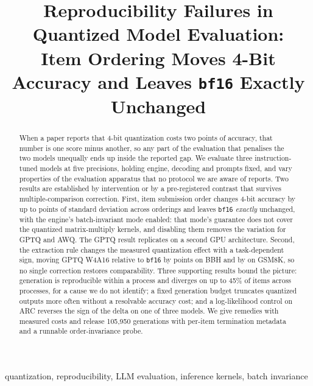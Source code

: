 \documentclass[conference]{IEEEtran}
\title{Reproducibility Failures in Quantized Model Evaluation:\\
Item Ordering Moves 4-Bit Accuracy and Leaves \texttt{bf16} Exactly Unchanged}
\author{%
\IEEEauthorblockN{Joseph Sankoorikal Johny}
\IEEEauthorblockA{Independent Researcher\\Seattle, USA\\\texttt{joseph.sankoorikal@gmail.com}}
\and
\IEEEauthorblockN{Syed Ahmed Danish}
\IEEEauthorblockA{Independent Researcher\\Hartford, USA\\\texttt{syed.danish47@gmail.com}}
\and
\IEEEauthorblockN{Aniruddha Sharma}
\IEEEauthorblockA{Independent Researcher\\Seattle, USA\\\texttt{anirudh217sharma@gmail.com}}}
\begin{document}
\maketitle

\begin{abstract}
When a paper reports that 4-bit quantization costs two points of accuracy, that number is
one score minus another, so any part of the evaluation that penalises the two models
unequally ends up inside the reported gap. We evaluate three instruction-tuned models at
five precisions, holding engine, decoding and prompts fixed, and vary properties of the
evaluation apparatus that no protocol we are aware of reports. Two results are established
by intervention or by a pre-registered contrast that survives multiple-comparison correction.
First, item submission order changes 4-bit accuracy by up to \hEightWorstSDTen{} points of
standard deviation across \hEightSDOrderings{} orderings and leaves \texttt{bf16}
\emph{exactly} unchanged, with the engine's batch-invariant mode enabled: that mode's
guarantee does not cover the quantized matrix-multiply kernels, and disabling them removes
the variation for GPTQ and AWQ. The GPTQ result replicates on a second GPU architecture. Second, the extraction rule changes the measured
quantization effect with a task-dependent sign, moving GPTQ W4A16 relative to
\texttt{bf16} by \hThreeBbhGptqFour{} points on BBH and by \hThreeGsmGptqFour{} on GSM8K,
so no single correction restores comparability. Three supporting results bound the
picture: generation is reproducible within a process and diverges on up to 45\% of items
across processes, for a cause we do not identify; a fixed generation budget truncates
quantized outputs more often without a resolvable accuracy cost; and a log-likelihood
control on ARC reverses the sign of the delta on one of three models. We give remedies
with measured costs and release 105{,}950 generations with per-item termination metadata
and a runnable order-invariance probe.
\end{abstract}

\begin{IEEEkeywords}
quantization, reproducibility, LLM evaluation, inference kernels, batch invariance
\end{IEEEkeywords}

\end{document}
